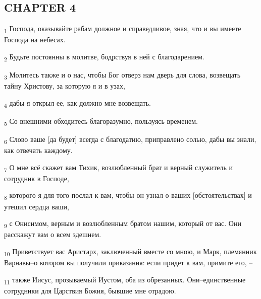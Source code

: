 \subsection{CHAPTER 4}
\begin{tcolorbox}
\textsubscript{1} Господа, оказывайте рабам должное и справедливое, зная, что и вы имеете Господа на небесах.
\end{tcolorbox}
\begin{tcolorbox}
\textsubscript{2} Будьте постоянны в молитве, бодрствуя в ней с благодарением.
\end{tcolorbox}
\begin{tcolorbox}
\textsubscript{3} Молитесь также и о нас, чтобы Бог отверз нам дверь для слова, возвещать тайну Христову, за которую я и в узах,
\end{tcolorbox}
\begin{tcolorbox}
\textsubscript{4} дабы я открыл ее, как должно мне возвещать.
\end{tcolorbox}
\begin{tcolorbox}
\textsubscript{5} Со внешними обходитесь благоразумно, пользуясь временем.
\end{tcolorbox}
\begin{tcolorbox}
\textsubscript{6} Слово ваше [да будет] всегда с благодатию, приправлено солью, дабы вы знали, как отвечать каждому.
\end{tcolorbox}
\begin{tcolorbox}
\textsubscript{7} О мне всё скажет вам Тихик, возлюбленный брат и верный служитель и сотрудник в Господе,
\end{tcolorbox}
\begin{tcolorbox}
\textsubscript{8} которого я для того послал к вам, чтобы он узнал о ваших [обстоятельствах] и утешил сердца ваши,
\end{tcolorbox}
\begin{tcolorbox}
\textsubscript{9} с Онисимом, верным и возлюбленным братом нашим, который от вас. Они расскажут вам о всем здешнем.
\end{tcolorbox}
\begin{tcolorbox}
\textsubscript{10} Приветствует вас Аристарх, заключенный вместе со мною, и Марк, племянник Варнавы--о котором вы получили приказания: если придет к вам, примите его, --
\end{tcolorbox}
\begin{tcolorbox}
\textsubscript{11} также Иисус, прозываемый Иустом, оба из обрезанных. Они--единственные сотрудники для Царствия Божия, бывшие мне отрадою.
\end{tcolorbox}
